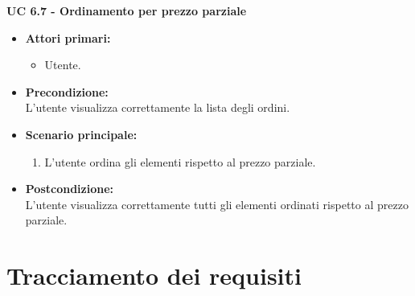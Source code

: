 \vspace{0.4cm}

\noindent \textbf{\large UC 6.7 - Ordinamento per prezzo parziale}
\label{uc:ordinamento-prezzo-parziale-ord}
\begin{itemize}

	\item \textbf{Attori primari: }
		\begin{itemize}
			\item Utente.
		\end{itemize}

	\item \textbf{Precondizione: }\\[0.3cm]
		L'utente visualizza correttamente la lista degli ordini.

	\item \textbf{Scenario principale: }
		\begin{enumerate}
			\item L'utente ordina gli elementi rispetto al prezzo parziale.
		\end{enumerate}
		

	\item \textbf{Postcondizione: }\\[0.3cm]
		L'utente visualizza correttamente tutti gli elementi ordinati rispetto al prezzo parziale.

\end{itemize}

\vspace{0.4cm}

\section{Tracciamento dei requisiti}

